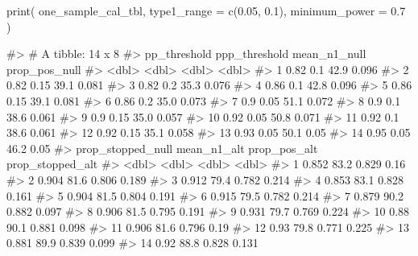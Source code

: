 \begin{Schunk}
\begin{Sinput}
print(
  one_sample_cal_tbl,
  type1_range = c(0.05, 0.1),
  minimum_power = 0.7
)
\end{Sinput}
\begin{Soutput}
#> # A tibble: 14 x 8
#>    pp_threshold ppp_threshold mean_n1_null prop_pos_null
#>           <dbl>         <dbl>        <dbl>         <dbl>
#>  1         0.82          0.1          42.9         0.096
#>  2         0.82          0.15         39.1         0.081
#>  3         0.82          0.2          35.3         0.076
#>  4         0.86          0.1          42.8         0.096
#>  5         0.86          0.15         39.1         0.081
#>  6         0.86          0.2          35.0         0.073
#>  7         0.9           0.05         51.1         0.072
#>  8         0.9           0.1          38.6         0.061
#>  9         0.9           0.15         35.0         0.057
#> 10         0.92          0.05         50.8         0.071
#> 11         0.92          0.1          38.6         0.061
#> 12         0.92          0.15         35.1         0.058
#> 13         0.93          0.05         50.1         0.05 
#> 14         0.95          0.05         46.2         0.05 
#>    prop_stopped_null mean_n1_alt prop_pos_alt prop_stopped_alt
#>                <dbl>       <dbl>        <dbl>            <dbl>
#>  1             0.852        83.2        0.829            0.16 
#>  2             0.904        81.6        0.806            0.189
#>  3             0.912        79.4        0.782            0.214
#>  4             0.853        83.1        0.828            0.161
#>  5             0.904        81.5        0.804            0.191
#>  6             0.915        79.5        0.782            0.214
#>  7             0.879        90.2        0.882            0.097
#>  8             0.906        81.5        0.795            0.191
#>  9             0.931        79.7        0.769            0.224
#> 10             0.88         90.1        0.881            0.098
#> 11             0.906        81.6        0.796            0.19 
#> 12             0.93         79.8        0.771            0.225
#> 13             0.881        89.9        0.839            0.099
#> 14             0.92         88.8        0.828            0.131
\end{Soutput}
\end{Schunk}

